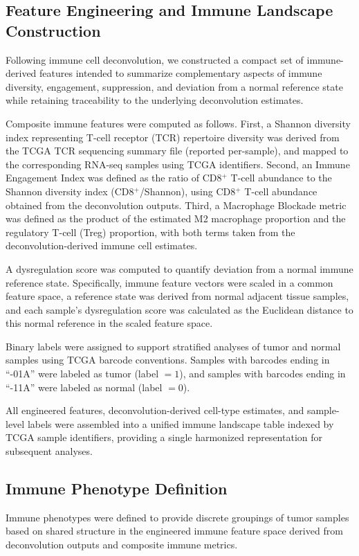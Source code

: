 \documentclass[conference]{IEEEtran}
\begin{document}
\subsection{Feature Engineering and Immune Landscape Construction}
Following immune cell deconvolution, we constructed a compact set of immune-derived features intended to summarize complementary aspects of immune diversity, engagement, suppression, and deviation from a normal reference state while retaining traceability to the underlying deconvolution estimates.

Composite immune features were computed as follows.
First, a Shannon diversity index representing T-cell receptor (TCR) repertoire diversity was derived from the TCGA TCR sequencing summary file (reported per-sample), and mapped to the corresponding RNA-seq samples using TCGA identifiers.
Second, an Immune Engagement Index was defined as the ratio of CD8$^+$ T-cell abundance to the Shannon diversity index (CD8$^+$/Shannon), using CD8$^+$ T-cell abundance obtained from the deconvolution outputs.
Third, a Macrophage Blockade metric was defined as the product of the estimated M2 macrophage proportion and the regulatory T-cell (Treg) proportion, with both terms taken from the deconvolution-derived immune cell estimates.

A dysregulation score was computed to quantify deviation from a normal immune reference state.
Specifically, immune feature vectors were scaled in a common feature space, a reference state was derived from normal adjacent tissue samples, and each sample's dysregulation score was calculated as the Euclidean distance to this normal reference in the scaled feature space.

Binary labels were assigned to support stratified analyses of tumor and normal samples using TCGA barcode conventions.
Samples with barcodes ending in ``-01A'' were labeled as tumor (label $=1$), and samples with barcodes ending in ``-11A'' were labeled as normal (label $=0$).

All engineered features, deconvolution-derived cell-type estimates, and sample-level labels were assembled into a unified immune landscape table indexed by TCGA sample identifiers, providing a single harmonized representation for subsequent analyses.

\subsection{Immune Phenotype Definition}
Immune phenotypes were defined to provide discrete groupings of tumor samples based on shared structure in the engineered immune feature space derived from deconvolution outputs and composite immune metrics.
\end{document}
